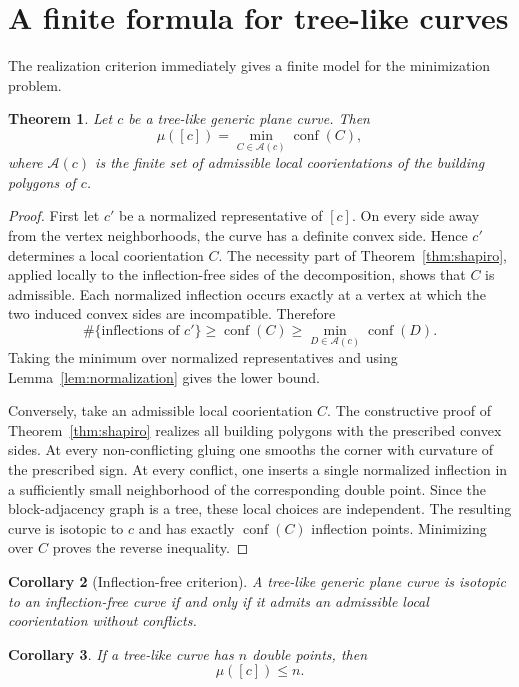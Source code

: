 \documentclass[11pt]{article}
\newtheorem{theorem}{Theorem}[section]
\newtheorem{corollary}[theorem]{Corollary}
\newcommand{\A}{\mathcal A}
\newcommand{\conf}{\operatorname{conf}}
\begin{document}
\section{A finite formula for tree-like curves}

The realization criterion immediately gives a finite model for the minimization problem.

\begin{theorem}\label{thm:formula}
Let $c$ be a tree-like generic plane curve.  Then
\[
 \mu([c])=
 \min_{C\in\A(c)} \conf(C),
\]
where $\A(c)$ is the finite set of admissible local coorientations of the building polygons of $c$.
\end{theorem}

\begin{proof}
First let $c'$ be a normalized representative of $[c]$.  On every side away from the vertex neighborhoods, the curve has a definite convex side.  Hence $c'$ determines a local coorientation $C$.  The necessity part of Theorem~\ref{thm:shapiro}, applied locally to the inflection-free sides of the decomposition, shows that $C$ is admissible.  Each normalized inflection occurs exactly at a vertex at which the two induced convex sides are incompatible.  Therefore
\[
 \#\{\text{inflections of }c'\}\ge \conf(C)\ge
 \min_{D\in\A(c)}\conf(D).
\]
Taking the minimum over normalized representatives and using Lemma~\ref{lem:normalization} gives the lower bound.

Conversely, take an admissible local coorientation $C$.  The constructive proof of Theorem~\ref{thm:shapiro} realizes all building polygons with the prescribed convex sides.  At every non-conflicting gluing one smooths the corner with curvature of the prescribed sign.  At every conflict, one inserts a single normalized inflection in a sufficiently small neighborhood of the corresponding double point.  Since the block-adjacency graph is a tree, these local choices are independent.  The resulting curve is isotopic to $c$ and has exactly $\conf(C)$ inflection points.  Minimizing over $C$ proves the reverse inequality.
\end{proof}

\begin{corollary}[Inflection-free criterion]\label{cor:zero}
A tree-like generic plane curve is isotopic to an inflection-free curve if and only if it admits an admissible local coorientation without conflicts.
\end{corollary}

\begin{corollary}\label{cor:upper}
If a tree-like curve has $n$ double points, then
\[
 \mu([c])\le n.
\]
\end{corollary}
\end{document}
